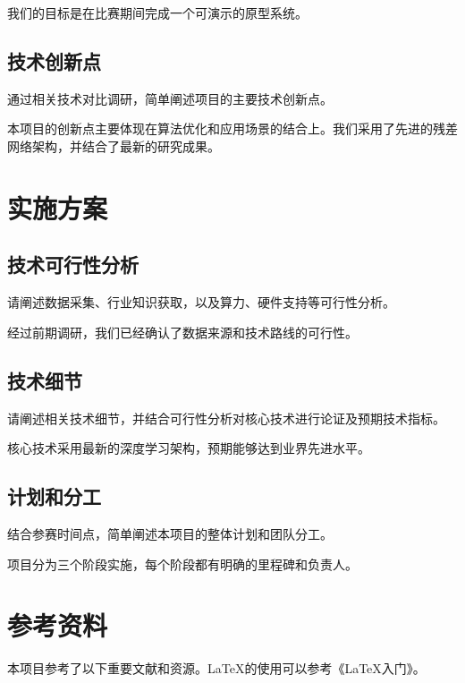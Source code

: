\documentclass{cpipc}
\begin{document}
我们的目标是在比赛期间完成一个可演示的原型系统。

\subsection{技术创新点}

通过相关技术对比调研，简单阐述项目的主要技术创新点。

本项目的创新点主要体现在算法优化和应用场景的结合上。我们采用了先进的残差网络架构\cite{he2016deep}，并结合了最新的研究成果\cite{zhang2023deep,li2023neural}。

\section{实施方案}
\subsection{技术可行性分析}

请阐述数据采集、行业知识获取，以及算力、硬件支持等可行性分析。

经过前期调研，我们已经确认了数据来源和技术路线的可行性。

\subsection{技术细节}

请阐述相关技术细节，并结合可行性分析对核心技术进行论证及预期技术指标。

核心技术采用最新的深度学习架构，预期能够达到业界先进水平。

\subsection{计划和分工}

结合参赛时间点，简单阐述本项目的整体计划和团队分工。

项目分为三个阶段实施，每个阶段都有明确的里程碑和负责人。



\section{参考资料}

本项目参考了以下重要文献和资源。LaTeX的使用可以参考《LaTeX入门》\cite{liuhaiyang2013latex}。

\renewcommand{\refname}{}%
\vspace{-\baselineskip}%


\end{document}
